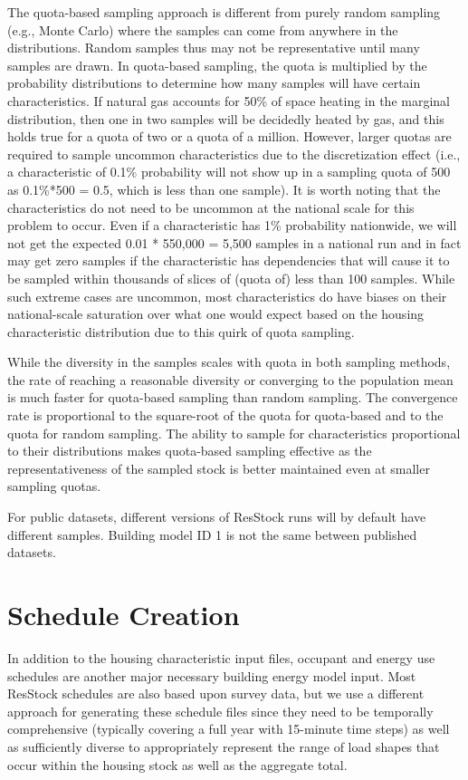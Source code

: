 The quota-based sampling approach is different from purely random sampling (e.g., Monte Carlo) where the samples can come from anywhere in the distributions. Random samples thus may not be representative until many samples are drawn. In quota-based sampling, the quota is multiplied by the probability distributions to determine how many samples will have certain characteristics. If natural gas accounts for 50\% of space heating in the marginal distribution, then one in two samples will be decidedly heated by gas, and this holds true for a quota of two or a quota of a million. However, larger quotas are required to sample uncommon characteristics due to the discretization effect (i.e., a characteristic of 0.1\% probability will not show up in a sampling quota of 500 as 0.1\%*500 = 0.5, which is less than one sample). It is worth noting that the characteristics do not need to be uncommon at the national scale for this problem to occur. Even if a characteristic has 1\% probability nationwide, we will not get the expected 0.01 * 550,000 = 5,500 samples in a national run and in fact may get zero samples if the characteristic has dependencies that will cause it to be sampled within thousands of slices of (quota of) less than 100 samples. While such extreme cases are uncommon, most characteristics do have biases on their national-scale saturation over what one would expect based on the housing characteristic distribution due to this quirk of quota sampling. 

While the diversity in the samples scales with quota in both sampling methods, the rate of reaching a reasonable diversity or converging to the population mean is much faster for quota-based sampling than random sampling. The convergence rate is proportional to the square-root of the quota for quota-based and to the quota for random sampling. The ability to sample for characteristics proportional to their distributions makes quota-based sampling effective as the representativeness of the sampled stock is better maintained even at smaller sampling quotas.

For public datasets, different versions of ResStock runs will by default have different samples. Building model ID 1 is not the same between published datasets.

\section{Schedule Creation}\label{occupancy_model}
In addition to the housing characteristic input files, occupant and energy use schedules are another major necessary building energy model input. Most ResStock schedules are also based upon survey data, but we use a different approach for generating these schedule files since they need to be temporally comprehensive (typically covering a full year with 15-minute time steps) as well as sufficiently diverse to appropriately represent the range of load shapes that occur within the housing stock as well as the aggregate total.


